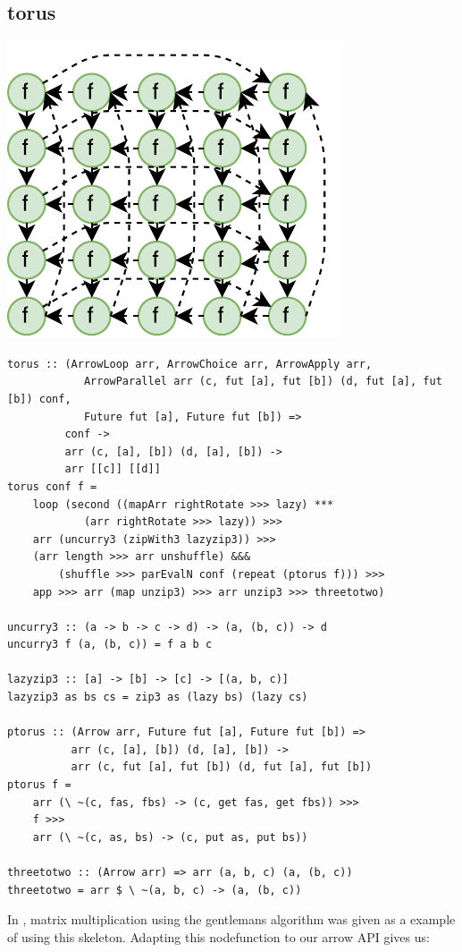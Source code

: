 \subsection{torus}
\begin{center}
	\includegraphics[scale=0.75]{images/torus}
\end{center}
\begin{lstlisting}[frame=htrbl]
torus :: (ArrowLoop arr, ArrowChoice arr, ArrowApply arr,
            ArrowParallel arr (c, fut [a], fut [b]) (d, fut [a], fut [b]) conf,
            Future fut [a], Future fut [b]) =>
         conf ->
         arr (c, [a], [b]) (d, [a], [b]) ->
         arr [[c]] [[d]]
torus conf f =
	loop (second ((mapArr rightRotate >>> lazy) ***
			(arr rightRotate >>> lazy)) >>>
    arr (uncurry3 (zipWith3 lazyzip3)) >>>
    (arr length >>> arr unshuffle) &&&
        (shuffle >>> parEvalN conf (repeat (ptorus f))) >>>
    app >>> arr (map unzip3) >>> arr unzip3 >>> threetotwo)

uncurry3 :: (a -> b -> c -> d) -> (a, (b, c)) -> d
uncurry3 f (a, (b, c)) = f a b c

lazyzip3 :: [a] -> [b] -> [c] -> [(a, b, c)]
lazyzip3 as bs cs = zip3 as (lazy bs) (lazy cs)

ptorus :: (Arrow arr, Future fut [a], Future fut [b]) =>
          arr (c, [a], [b]) (d, [a], [b]) ->
          arr (c, fut [a], fut [b]) (d, fut [a], fut [b])
ptorus f =
	arr (\ ~(c, fas, fbs) -> (c, get fas, get fbs)) >>>
	f >>>
	arr (\ ~(c, as, bs) -> (c, put as, put bs))

threetotwo :: (Arrow arr) => arr (a, b, c) (a, (b, c))
threetotwo = arr $ \ ~(a, b, c) -> (a, (b, c))
\end{lstlisting}
In \cite{eden_cefp}, matrix multiplication using the gentlemans algorithm was given as a example of using this skeleton. Adapting this nodefunction to our arrow API gives us:
